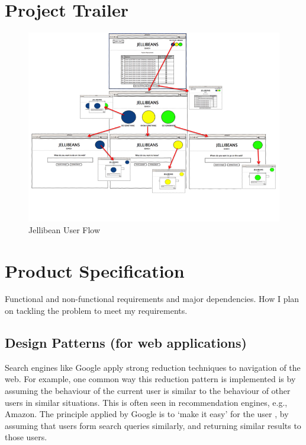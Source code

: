 \documentclass[a4paper, 11pt]{article}
\begin{document}
\section{Project Trailer}

\begin{figure}[H]
\begin{center}
\includegraphics[scale=0.7]{JellibeanFlow.png}
\end{center}
\caption{Jellibean User Flow}
\label{JBeanUserFlow}
\end{figure}


\section{Product Specification}
Functional and non-functional requirements and major dependencies.
How I plan on tackling the problem to meet my requirements.

\subsection{Design Patterns (for web applications)}

Search engines like Google apply strong reduction techniques to navigation of the web. For example, one common way this reduction pattern is implemented is by assuming the behaviour of the current user is similar to the behaviour of other users in similar situations. This is often seen in recommendation engines, e.g., Amazon. The principle applied by Google is to ‘make it easy’ for the user \cite{googleTerms}, by assuming that users form search queries similarly, and returning similar results to those users.
\end{document}
